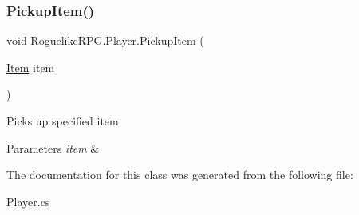 \subsubsection{\texorpdfstring{Pickup\+Item()}{PickupItem()}}
{\footnotesize\ttfamily void Roguelike\+R\+P\+G.\+Player.\+Pickup\+Item (\begin{DoxyParamCaption}\item[{\mbox{\hyperlink{class_roguelike_r_p_g_1_1_item}{Item}}}]{item }\end{DoxyParamCaption})\hspace{0.3cm}{\ttfamily [inline]}}



Picks up specified item. 


\begin{DoxyParams}{Parameters}
{\em item} & \\
\hline
\end{DoxyParams}


The documentation for this class was generated from the following file\+:\begin{DoxyCompactItemize}
\item 
Player.\+cs\end{DoxyCompactItemize}
